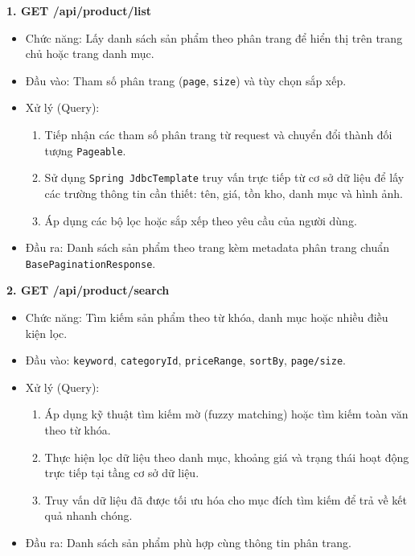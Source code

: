 \textbf{1. GET /api/product/list}
\begin{itemize}
    \item Chức năng: Lấy danh sách sản phẩm theo phân trang để hiển thị trên trang chủ hoặc trang danh mục.
    \item Đầu vào: Tham số phân trang (\texttt{page}, \texttt{size}) và tùy chọn sắp xếp.
    \item Xử lý (Query):
    \begin{enumerate}
        \item Tiếp nhận các tham số phân trang từ request và chuyển đổi thành đối tượng \texttt{Pageable}.
        \item Sử dụng \texttt{Spring JdbcTemplate} truy vấn trực tiếp từ cơ sở dữ liệu để lấy các trường thông tin cần thiết: tên, giá, tồn kho, danh mục và hình ảnh.
        \item Áp dụng các bộ lọc hoặc sắp xếp theo yêu cầu của người dùng.
    \end{enumerate}
    \item Đầu ra: Danh sách sản phẩm theo trang kèm metadata phân trang chuẩn \texttt{BasePaginationResponse}.
\end{itemize}

\textbf{2. GET /api/product/search}
\begin{itemize}
    \item Chức năng: Tìm kiếm sản phẩm theo từ khóa, danh mục hoặc nhiều điều kiện lọc.
    \item Đầu vào: \texttt{keyword}, \texttt{categoryId}, \texttt{priceRange}, \texttt{sortBy}, \texttt{page/size}.
    \item Xử lý (Query):
    \begin{enumerate}
        \item Áp dụng kỹ thuật tìm kiếm mờ (fuzzy matching) hoặc tìm kiếm toàn văn theo từ khóa.
        \item Thực hiện lọc dữ liệu theo danh mục, khoảng giá và trạng thái hoạt động trực tiếp tại tầng cơ sở dữ liệu.
        \item Truy vấn dữ liệu đã được tối ưu hóa cho mục đích tìm kiếm để trả về kết quả nhanh chóng.
    \end{enumerate}
    \item Đầu ra: Danh sách sản phẩm phù hợp cùng thông tin phân trang.
\end{itemize}


